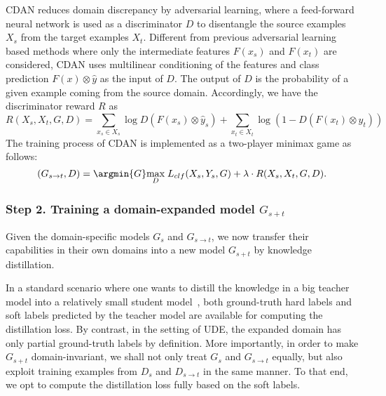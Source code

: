 CDAN reduces domain discrepancy by adversarial learning, where a feed-forward neural network is used as a discriminator $D$ to disentangle the source examples $X_s$ from the target examples $X_t$. Different from previous adversarial learning based methods where only the intermediate features $F(x_s)$ and $F(x_t)$ are considered, CDAN uses multilinear conditioning of the features and class prediction $F(x)\otimes \hat{y}$ as the input of $D$. The output of $D$ is the probability of a given example coming from the source domain. Accordingly, we have the discriminator reward $R$ as 
\begin{equation}
R(X_s,X_t,G,D) = \sum_{x_s \in X_s} \log D(F(x_s)\otimes \hat{y}_s) + \sum_{x_t \in X_t} \log (1 - D(F(x_t) \otimes \hat{y}_t))
\end{equation} 
The training process of CDAN is implemented as a two-player minimax game as follows:
\begin{equation} \label{eq:cdan}
    (G_{s\rightarrow t}, D)=\argmin{G} \underset{D}{\max}\; L_{clf}(X_s, Y_s, G) + \lambda \cdot R(X_s, X_t, G, D).
\end{equation}















\subsubsection{Step 2. Training a domain-expanded model $G_{s+t}$}

Given the domain-specific models $G_s$ and $G_{s\rightarrow t}$, we now transfer their capabilities in their own domains into a new model $G_{s+t}$ by knowledge distillation. 

In a standard scenario where one wants to distill the knowledge in a big teacher model into a relatively small student model~\cite{nips15-kd}, both ground-truth hard labels and soft labels predicted by the teacher model are available for computing the distillation loss. By contrast, in the setting of UDE, the expanded domain has only partial ground-truth labels by definition. More importantly, in order to make $G_{s+t}$ domain-invariant, we shall not only treat $G_s$ and $G_{s\rightarrow t}$ equally, but also exploit training examples from $D_s$ and $D_{s\rightarrow t}$ in the same manner. To that end, we opt to compute the distillation loss fully based on the soft labels. 

